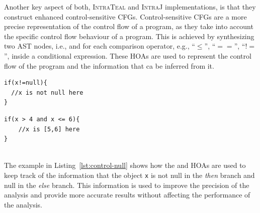 Another key aspect of both, \textsc{IntraTeal} and \textsc{IntraJ} implementations, is that they
construct enhanced control-sensitive CFGs. Control-sensitive CFGs
are a more precise representation of the control flow of a program, as they take
into account the specific control flow behaviour of a program. This is achieved by
synthesizing two AST nodes, i.e.,  and  for each
comparison operator, e.g.,  ``$\le$'', ``$==$'', ``$!=$'', inside a conditional expression.
These HOAs are used to represent the control flow of the program and the information that ca be inferred from
it. \\
%
\begin{minipage}{0.45\textwidth}
    \begin{lstlisting}[language=JastAdd,caption={Control-sensitivity to improve null pointer analysis.}, label={lst:control-null}]
if(x!=null){
  //x is not null here
}
    \end{lstlisting}
    \end{minipage}\hfill%
    \begin{minipage}{0.45\textwidth}
    \begin{lstlisting}[language=JastAdd,caption={Control-sensitivity to improve interval analysis.}, label={lst:control-interval}]
if(x > 4 and x <= 6){
    //x is [5,6] here
}
    \end{lstlisting}
\end{minipage}\\
The example in Listing~\ref{lst:control-null} shows how the  and 
HOAs are used to keep track of the information that the object \texttt{x} is not null
in the \emph{then} branch and null in the \emph{else} branch.
This information is used to improve the precision of the analysis and provide
more accurate results without affecting the performance of the analysis.

